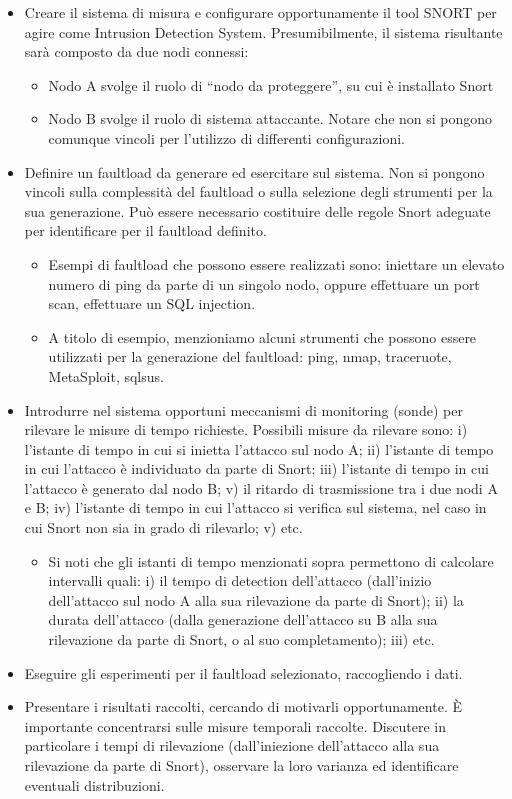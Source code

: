 \begin{itemize}
	\item Creare il sistema di misura e configurare opportunamente il tool SNORT per agire come Intrusion Detection System. Presumibilmente, il sistema risultante sarà composto da due nodi connessi:
	\begin{itemize}
		\item Nodo A svolge il ruolo di “nodo da proteggere”, su cui è installato Snort
		\item Nodo B svolge il ruolo di sistema attaccante. Notare che non si pongono comunque vincoli per l’utilizzo di differenti configurazioni.
	\end{itemize}
	\item Definire un faultload da generare ed esercitare sul sistema. Non si pongono vincoli sulla complessità del faultload o sulla selezione degli strumenti per la sua generazione. Può essere necessario costituire delle regole Snort adeguate per identificare per il faultload definito.
	\begin{itemize}
		\item Esempi di faultload che possono essere realizzati sono: iniettare un elevato numero di ping da parte di un singolo nodo, oppure effettuare un port scan, effettuare un SQL injection.
		\item A titolo di esempio, menzioniamo alcuni strumenti che possono essere utilizzati per la generazione del faultload: ping, nmap, traceruote, MetaSploit, sqlsus.
	\end{itemize}
	\item Introdurre nel sistema opportuni meccanismi di monitoring (sonde) per rilevare le misure di tempo richieste. Possibili misure da rilevare sono: i) l’istante di tempo in cui si inietta l’attacco sul nodo A; ii) l’istante di tempo in cui l’attacco è individuato da parte di Snort; iii) l’istante di tempo in cui l’attacco è generato dal nodo B; v) il ritardo di trasmissione tra i due nodi A e B; iv) l’istante di tempo in cui l’attacco si verifica sul sistema, nel caso in cui Snort non sia in grado di rilevarlo; v) etc.
	\begin{itemize}
		\item Si noti che gli istanti di tempo menzionati sopra permettono di calcolare intervalli quali: i) il tempo di detection dell’attacco (dall’inizio dell’attacco sul nodo A alla sua rilevazione da parte di Snort); ii) la durata dell’attacco (dalla generazione dell’attacco su B alla sua rilevazione da parte di Snort, o al suo completamento); iii) etc.
	\end{itemize}
	\item Eseguire gli esperimenti per il faultload selezionato, raccogliendo i dati.
	\item Presentare i risultati raccolti, cercando di motivarli opportunamente. È importante concentrarsi sulle misure temporali raccolte. Discutere in particolare i tempi di rilevazione (dall’iniezione dell’attacco alla sua rilevazione da parte di Snort), osservare la loro varianza ed identificare eventuali distribuzioni.
\end{itemize}
